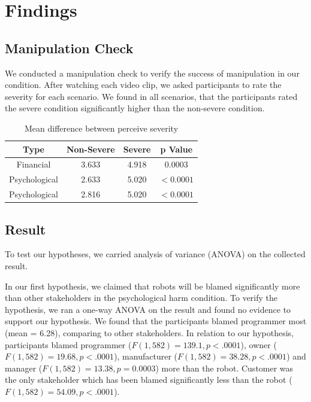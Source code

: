 \documentclass{sigchi}
\begin{document}
\section{Findings}
\subsection{Manipulation Check}
We conducted a manipulation check to verify the success of manipulation in our condition. After watching each video clip, we asked participants to rate the severity for each scenario. We found in all scenarios, that the participants rated the severe condition significantly higher than the non-severe condition.

\begin{table}
  \centering
  \begin{tabular}{|c|c|c|c|}
    \hline
    Type & Non-Severe & Severe & p Value \\
    \hline
    Financial & 3.633 & 4.918 & 0.0003 \\
    \hline
    Psychological & 2.633 & 5.020 & $ < 0.0001$ \\
    \hline
    Psychological & 2.816 & 5.020 & $ < 0.0001$ \\
    \hline
  \end{tabular}
  \caption{Mean difference between perceive severity}
  \label{tab:table1}
\end{table}

\subsection{Result}
To test our hypotheses, we carried analysis of variance (ANOVA) on the collected result. 

In our first hypothesis, we claimed that robots will be blamed significantly more than other stakeholders in the psychological harm condition. To verify the hypothesis, we ran a one-way ANOVA on the result and found no evidence to support our hypothesis. We found that the participants blamed programmer most (mean = 6.28), comparing to other stakeholders. In relation to our hypothesis, participants blamed programmer ($ F(1,582) =139.1, p < .0001$), owner ($ F(1,582) = 19.68, p < .0001$), manufacturer ($F(1,582) = 38.28, p < .0001$) and manager ($F(1,582) = 13.38, p = 0.0003$) more than the robot. Customer was the only stakeholder which has been blamed significantly less than the robot ($F(1,582) = 54.09, p < .0001$).
\end{document}
